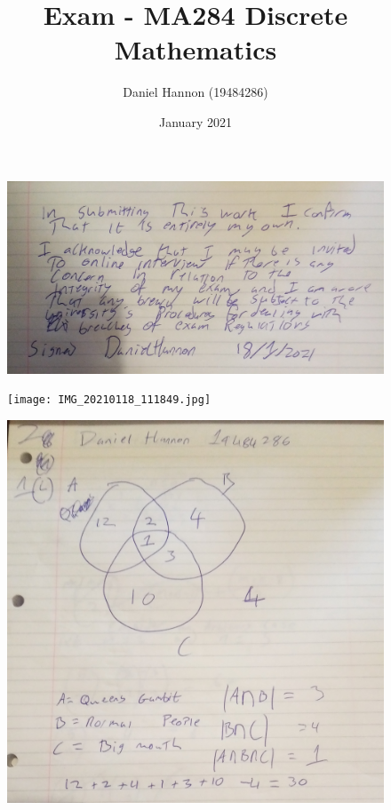\documentclass{article}
\title{Exam - MA284 Discrete Mathematics}
\author{Daniel Hannon (19484286)}
\date{January 2021}
\begin{document}
	\maketitle
	\begin{figure}
		\centering
		\includegraphics[width=\textwidth]{plagarism.jpg}
	\end{figure}
	\newpage
	\begin{figure}
		\centering
		\texttt{[image: IMG\_20210118\_111849.jpg]}
	\end{figure}
	\newpage
	\begin{figure}
		\centering
		\includegraphics[width=\textwidth]{IMG_20210118_111858.jpg}
	\end{figure}
\end{document}
